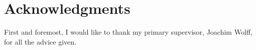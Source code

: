 \chapter{Acknowledgments}

First and foremost, I would like to thank my primary supervisor, Joachim Wolff,
for all the advice given.


%
